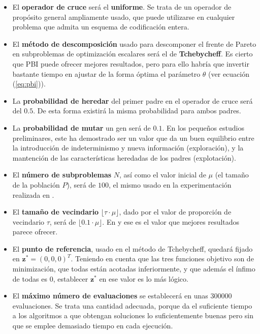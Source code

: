 \begin{itemize}
 \item El \textbf{operador de cruce} será el \textbf{uniforme}. Se trata de un operador de propósito general ampliamente usado, que puede utilizarse en cualquier problema que admita un esquema de codificación entera.
 \item El \textbf{método de descomposición} usado para descomponer el frente de Pareto en subproblemas de optimización escalares será el de \textbf{Tchebycheff}. Es cierto que PBI puede ofrecer mejores resultados, pero para ello habría que invertir bastante tiempo en ajustar de la forma óptima el parámetro $\theta$ (ver ecuación (\ref{eq:pbi})).
	\item La \textbf{probabilidad de heredar} del primer padre en el operador de cruce será del $0.5$. De esta forma existirá la misma probabilidad para ambos padres.
	\item La \textbf{probabilidad de mutar} un gen será de $0.1$. En los pequeños estudios preliminares, este ha demostrado ser un valor que da un buen equilibrio entre la introducción de indeterminismo y nueva información (exploración), y la mantención de las características heredadas de los padres (explotación).
	\item El \textbf{número de subproblemas} $N$, así como el valor inicial de $\mu$ (el tamaño de la población $P$), será de $100$, el mismo usado en la experimentación realizada en \cite{tanabe2018decomposition}.
	\item El \textbf{tamaño de vecindario} $\lfloor\tau \cdot \mu\rfloor$, dado por el valor de proporción de vecindario $\tau$, será de $\lfloor 0.1 \cdot \mu \rfloor$. En \cite{tanabe2019framework} y \cite{tanabe2018decomposition} ese es el valor que mejores resultados parece ofrecer.
	\item El \textbf{punto de referencia}, usado en el método de Tchebycheff, quedará fijado en $\textbf{z}^* = (0,0,0)^T$. Teniendo en cuenta que las tres funciones objetivo son de minimización, que todas están acotadas inferiormente, y que además el ínfimo de todas es $0$, establecer $\textbf{z}^*$ en ese valor es lo más lógico.
	\item El \textbf{máximo número de evaluaciones} se establecerá en unas $300000$ evaluaciones. Se trata una cantidad adecuada, porque da el suficiente tiempo a los algoritmos a que obtengan soluciones lo suficientemente buenas pero sin que se emplee demasiado tiempo en cada ejecución.
\end{itemize}


